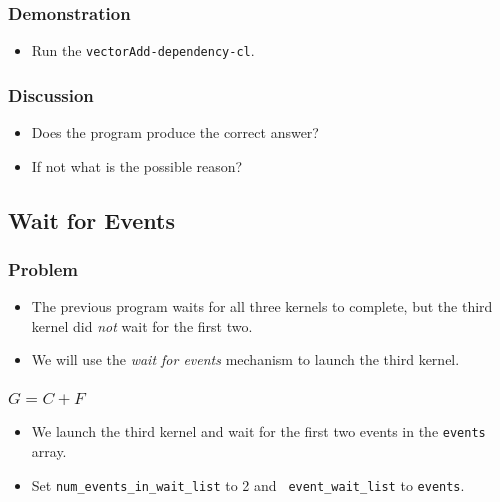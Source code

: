 \documentclass{beamer}
\begin{document}
\begin{frame}
  \frametitle{Demonstration}
  \begin{itemize}
    \item Run the {\tt vectorAdd-dependency-cl}.
  \end{itemize}
\end{frame}

\begin{frame}
  \frametitle{Discussion}
  \begin{itemize}
    \item Does the program produce the correct answer?  
    \item If not what is the possible reason?
  \end{itemize}
\end{frame}

\subsection{Wait for Events}

\begin{frame}
  \frametitle{Problem}
  \begin{itemize}
    \item The previous program waits for all three kernels to
      complete, but the third kernel did {\em not} wait for the first
      two.
    \item We will use the {\em wait for events} mechanism to launch
      the third kernel.
  \end{itemize}
\end{frame}

\begin{frame}
\end{frame}

\begin{frame}
  \frametitle{$G = C + F$}
  \begin{itemize}
    \item We launch the third kernel and wait for the first two events
      in the {\tt events} array.
    \item Set {\tt num\_events\_in\_wait\_list} to 2 and {\tt
      event\_wait\_list} to {\tt events}.
  \end{itemize}
\end{frame}

\begin{frame}
\end{frame}
\end{document}
